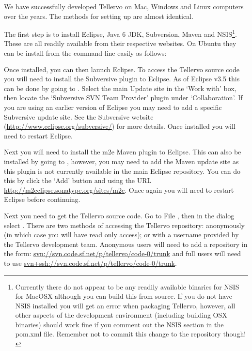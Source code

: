 We have successfully developed Tellervo on Mac, Windows and Linux computers over the years.  The methods for setting up are almost identical.  

The first step is to install Eclipse, Java 6 JDK, Subversion, Maven and NSIS\footnote{Currently there do not appear to be any readily available binaries for NSIS for MacOSX although you can build this from source.  If you do not have NSIS installed you will get an error when packaging Tellervo, however, all other aspects of the development environment (including building OSX binaries) should work fine if you comment out the NSIS section in the pom.xml file.  Remember not to commit this change to the repository though!}.  These are all readily available from their respective websites.  On Ubuntu they can be install from the command line easily as follows:


Once installed, you can then launch Eclipse.  To access the Tellervo source code you will need to install the Subversive plugin to Eclipse.  As of Eclipse v3.5 this can be done by going to .  Select the main Update site in the `Work with' box, then locate the `Subversive SVN Team Provider' plugin under `Collaboration'.  If you are using an earlier version of Eclipse you may need to add a specific Subversive update site.  See the Subversive website (\url{http://www.eclipse.org/subversive/}) for more details.  Once installed you will need to restart Eclipse.

Next you will need to install the m2e Maven plugin to Eclipse.  This can also be installed by going to , however, you may need to add the Maven update site as this plugin is not currently available in the main Eclipse repository.  You can do this by click the `Add' button and using the URL \url{http://m2eclipse.sonatype.org/sites/m2e}.  Once again you will need to restart Eclipse before continuing.

Next you need to get the Tellervo source code.  Go to File , then in the dialog select .  There are two methods of accessing the Tellervo repository: anonymously (in which case you will have read only access); or with a username provided by the Tellervo development team.  Anonymous users will need to add a repository in the form: \url{svn://svn.code.sf.net/p/tellervo/code-0/trunk} and full users will need to use \url{svn+ssh://svn.code.sf.net/p/tellervo/code-0/trunk}.

